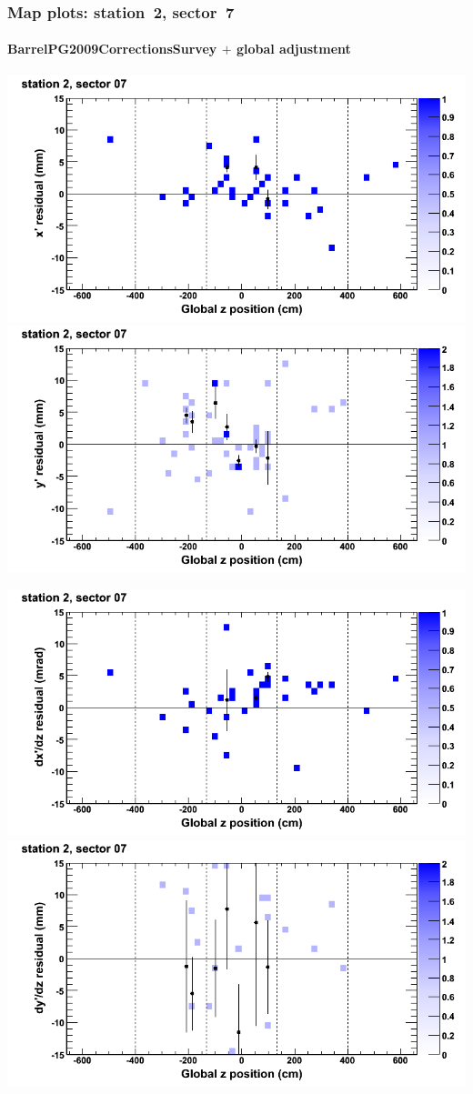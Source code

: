 \documentclass[compress]{beamer}
\begin{document}
\begin{frame}
\frametitle{Map plots: station~2, sector~7}
\framesubtitle{BarrelPG2009CorrectionsSurvey $+$ global adjustment}
\includegraphics[width=0.5\linewidth]{mapplots_re01/DTvsz_st2sec07_x.png}
\includegraphics[width=0.5\linewidth]{mapplots_re01/DTvsz_st2sec07_y.png}

\includegraphics[width=0.5\linewidth]{mapplots_re01/DTvsz_st2sec07_dxdz.png}
\includegraphics[width=0.5\linewidth]{mapplots_re01/DTvsz_st2sec07_dydz.png}
\end{frame}
\end{document}
